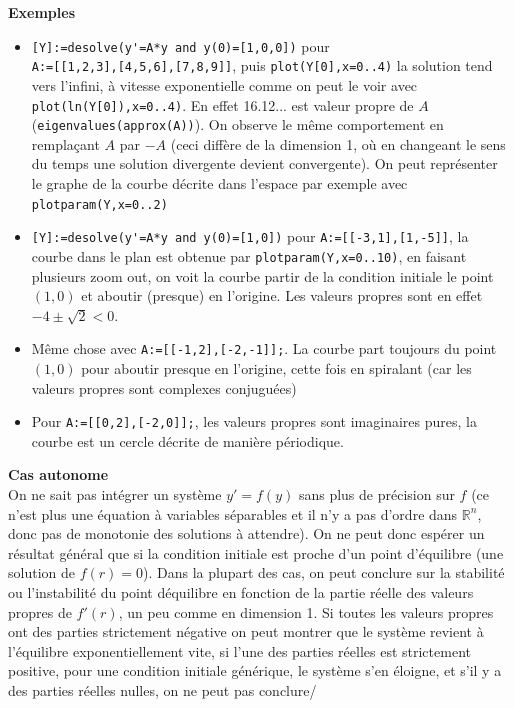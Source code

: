 \documentclass[a4paper,11pt]{book}
\begin{document}
\begin{giacjshere}
{\bf Exemples }
\begin{itemize}
\item
\verb|[Y]:=desolve(y'=A*y and y(0)=[1,0,0])| pour\\
\verb|A:=[[1,2,3],[4,5,6],[7,8,9]]|, 
puis \verb|plot(Y[0],x=0..4)| la solution tend vers l'infini,
\`a vitesse exponentielle comme on peut
le voir avec \verb|plot(ln(Y[0]),x=0..4)|.
En effet 16.12... est valeur propre de $A$
(\verb|eigenvalues(approx(A))|). On observe le m\^eme
comportement en rempla\c{c}ant $A$ par $-A$ (ceci
diff\`ere de la dimension 1, o\`u en changeant le sens
du temps une solution divergente devient convergente).
On peut repr\'esenter le graphe de la courbe d\'ecrite
dans l'espace par exemple avec \verb|plotparam(Y,x=0..2)|
\item \verb|[Y]:=desolve(y'=A*y and y(0)=[1,0])| pour 
\verb|A:=[[-3,1],[1,-5]]|, la courbe dans le plan est
obtenue par \verb|plotparam(Y,x=0..10)|, en faisant
plusieurs zoom out, on voit la courbe partir de la condition
initiale le point $(1,0)$ et aboutir (presque) en l'origine.
Les valeurs propres sont en effet $-4\pm \sqrt{2}<0$.
\item M\^eme chose avec \verb|A:=[[-1,2],[-2,-1]];|.
La courbe part toujours du point $(1,0)$ pour
aboutir presque en l'origine, cette fois en spiralant
(car les valeurs propres sont complexes conjugu\'ees)
\item Pour \verb|A:=[[0,2],[-2,0]];|, les valeurs
propres sont imaginaires pures, la courbe est un cercle
d\'ecrite de mani\`ere p\'eriodique.
\end{itemize}

{\bf Cas autonome}\\
On ne sait pas int\'egrer un syst\`eme $y'=f(y)$ sans plus
de pr\'ecision sur $f$ (ce n'est plus une \'equation \`a
variables s\'eparables et il n'y a pas d'ordre dans $\mathbb{R}^n$,
donc pas de monotonie des solutions \`a attendre).
On ne peut donc
esp\'erer un r\'esultat g\'en\'eral que si la condition initiale 
est proche d'un point d'\'equilibre (une solution de $f(r)=0$).
Dans la plupart des cas, on peut conclure sur la stabilit\'e
ou l'instabilit\'e du point d\'equilibre en fonction de la partie
r\'eelle des valeurs propres de $f'(r)$, un peu comme en dimension 1.
Si toutes les valeurs propres ont des parties strictement n\'egative
on peut montrer que
le syst\`eme revient \`a l'\'equilibre exponentiellement vite, si
l'une des parties r\'eelles est strictement positive,
pour une condition initiale g\'en\'erique, le syst\`eme s'en
\'eloigne, et s'il y a des parties r\'eelles nulles, on ne peut pas conclure/


\end{giacjshere}
\end{document}
